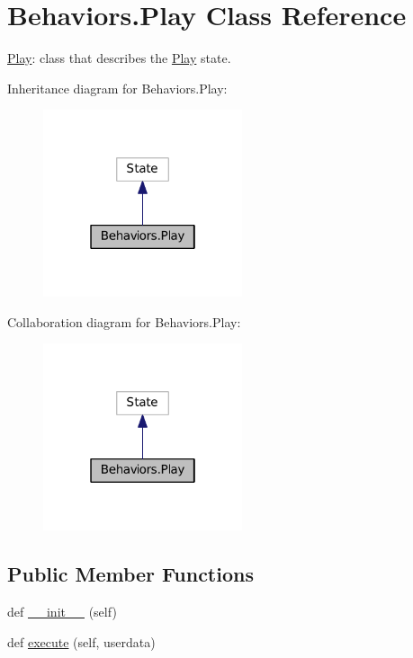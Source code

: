 \hypertarget{classBehaviors_1_1Play}{}\section{Behaviors.\+Play Class Reference}
\label{classBehaviors_1_1Play}


\hyperlink{classBehaviors_1_1Play}{Play}\+: class that describes the \hyperlink{classBehaviors_1_1Play}{Play} state.  




Inheritance diagram for Behaviors.\+Play\+:\nopagebreak
\begin{figure}[H]
\begin{center}
\leavevmode
\includegraphics[width=166pt]{classBehaviors_1_1Play__inherit__graph}
\end{center}
\end{figure}


Collaboration diagram for Behaviors.\+Play\+:\nopagebreak
\begin{figure}[H]
\begin{center}
\leavevmode
\includegraphics[width=166pt]{classBehaviors_1_1Play__coll__graph}
\end{center}
\end{figure}
\subsection*{Public Member Functions}
\begin{DoxyCompactItemize}
\item 
def \hyperlink{classBehaviors_1_1Play_a5a5684ee3c87670a8eeeadb57ecba0d3}{\+\_\+\+\_\+init\+\_\+\+\_\+} (self)
\item 
def \hyperlink{classBehaviors_1_1Play_a2c8c1be112cceeb3b11c2450755306fe}{execute} (self, userdata)
\end{DoxyCompactItemize}


